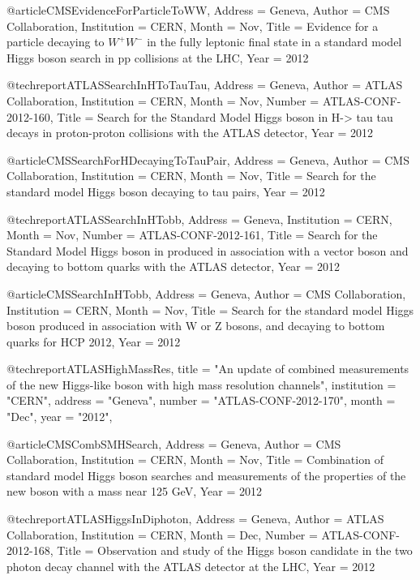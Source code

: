 {{{{{{@article{CMSEvidenceForParticleToWW,
	Address = {Geneva},
	Author = {CMS Collaboration},
	Institution = {CERN},
	Month = {Nov},
	Title = {Evidence for a particle decaying to $W^+ W^-$ in the fully leptonic final state in a standard model Higgs boson search in pp collisions at the LHC},
	Year = {2012}}

@techreport{ATLASSearchInHToTauTau,
	Address = {Geneva},
	Author = {ATLAS Collaboration},
	Institution = {CERN},
	Month = {Nov},
	Number = {ATLAS-CONF-2012-160},
	Title = {Search for the Standard Model Higgs boson in H-> tau tau decays in proton-proton collisions with the ATLAS detector},
	Year = {2012}}

@article{CMSSearchForHDecayingToTauPair,
	Address = {Geneva},
	Author = {CMS Collaboration},
	Institution = {CERN},
	Month = {Nov},
	Title = {Search for the standard model Higgs boson decaying to tau pairs},
	Year = {2012}}

@techreport{ATLASSearchInHTobb,
	Address = {Geneva},
	Institution = {CERN},
	Month = {Nov},
	Number = {ATLAS-CONF-2012-161},
	Title = {Search for the Standard Model Higgs boson in produced in association with a vector boson and decaying to bottom quarks with the ATLAS detector},
	Year = {2012}}

@article{CMSSearchInHTobb,
	Address = {Geneva},
	Author = {CMS Collaboration},
	Institution = {CERN},
	Month = {Nov},
	Title = {Search for the standard model Higgs boson produced in association with W or Z bosons, and decaying to bottom quarks for HCP 2012},
	Year = {2012}}
	
	@techreport{ATLASHighMassRes,
      title        = "An update of combined measurements of the new Higgs-like
                      boson with high mass resolution channels",
      institution  = "CERN",
      address      = "Geneva",
      number       = "ATLAS-CONF-2012-170",
      month        = "Dec",
      year         = "2012",
}

@article{CMSCombSMHSearch,
	Address = {Geneva},
	Author = {CMS Collaboration},
	Institution = {CERN},
	Month = {Nov},
	Title = {Combination of standard model Higgs boson searches and measurements of the properties of the new boson with a mass near 125 GeV},
	Year = {2012}}

@techreport{ATLASHiggsInDiphoton,
	Address = {Geneva},
	Author = {ATLAS Collaboration},
	Institution = {CERN},
	Month = {Dec},
	Number = {ATLAS-CONF-2012-168},
	Title = {Observation and study of the Higgs boson candidate in the two photon decay channel with the ATLAS detector at the LHC},
	Year = {2012}}

}}}}}}
